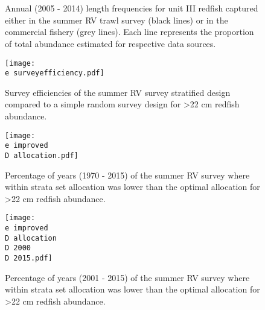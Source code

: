 \documentclass[11pt]{article}
\newcommand{\D}{.}
\newcommand{\e}{/home/ecomod_data/redfish/figures/}
\begin{document}
\begin{landscape}
\begin{figure}
\centering
{}
\\
\\

\caption{Annual (2005 - 2014) length frequencies for unit III redfish captured either in the summer RV trawl survey (black lines) or in the commercial fishery (grey lines). Each line represents the proportion of total abundance estimated for respective data sources.}
\end{figure}
\clearpage
\end{landscape}
\begin{figure}
\centering
    \texttt{[image: \\e surveyefficiency.pdf]}
    \caption{Survey efficiencies of the summer RV survey stratified design compared to a simple random survey design for \textgreater 22 cm redfish abundance. }

\end{figure}
\clearpage

\begin{figure}
\centering
    \texttt{[image: \\e improved\\D allocation.pdf]}
    \caption{Percentage of years (1970 - 2015) of the summer RV survey where within strata set allocation was lower than the optimal allocation for \textgreater 22 cm redfish abundance.}

\end{figure}
\clearpage

\begin{figure}
\centering
    \texttt{[image: \\e improved\\D allocation\\D 2000\\D 2015.pdf]}
    \caption{Percentage of years (2001 - 2015) of the summer RV survey where within strata set allocation was lower than the optimal allocation for \textgreater 22 cm redfish abundance.}

\end{figure}
\clearpage
\end{document}

